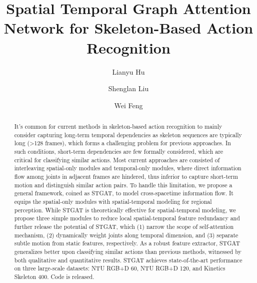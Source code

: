\documentclass[runningheads]{llncs}
\begin{document}
\pagestyle{headings}
\mainmatter
\def\ECCVSubNumber{149}  

\title{Spatial Temporal Graph Attention Network for Skeleton-Based Action Recognition} 

\begin{comment}
\titlerunning{ECCV-22 submission ID \ECCVSubNumber} 
\authorrunning{ECCV-22 submission ID \ECCVSubNumber} 
\author{Anonymous ECCV submission}
\institute{Paper ID \ECCVSubNumber}
\end{comment}


\author{Lianyu Hu \and
Shenglan Liu \and
Wei Feng}
\vspace{-20px}
\maketitle

\begin{abstract}
It's common for current methods in skeleton-based action recognition to mainly consider capturing long-term temporal dependencies as skeleton sequences are typically long (\textgreater 128 frames), which forms a challenging problem for previous approaches. In such conditions, short-term dependencies are few formally considered, which are critical for classifying similar actions. Most current approaches are consisted of interleaving spatial-only modules and temporal-only modules, where direct information flow among joints in adjacent frames are hindered, thus inferior to capture short-term motion and distinguish similar action pairs. To handle this limitation, we propose a general framework, coined as STGAT, to model cross-spacetime information flow. It equips the spatial-only modules with spatial-temporal modeling for regional perception. While STGAT is theoretically effective for spatial-temporal modeling, we propose three simple modules to reduce local spatial-temporal feature redundancy and further release the potential of STGAT, which (1) narrow the scope of self-attention mechanism, (2) dynamically weight joints along temporal dimension, and (3) separate subtle motion from static features, respectively. As a robust feature extractor, STGAT generalizes better upon classifying similar actions than previous methods, witnessed by both qualitative and quantitative results. STGAT achieves state-of-the-art performance on three large-scale datasets: NTU RGB+D 60, NTU RGB+D 120, and Kinetics Skeleton 400. Code is released.
\end{abstract}
  
\end{document}
